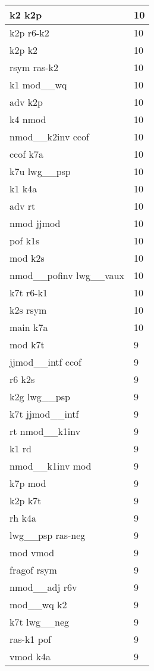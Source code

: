\documentclass[a4 paper]{article}
\begin{document}
\begin{longtable}{p{}p{}}
k2 k2p  & 10 \\ \midrule
k2p r6-k2  & 10 \\ \midrule
k2p k2  & 10 \\ \midrule
rsym ras-k2  & 10 \\ \midrule
k1 mod\_\_wq  & 10 \\ \midrule
adv k2p  & 10 \\ \midrule
k4 nmod  & 10 \\ \midrule
nmod\_\_k2inv ccof  & 10 \\ \midrule
ccof k7a  & 10 \\ \midrule
k7u lwg\_\_psp  & 10 \\ \midrule
k1 k4a  & 10 \\ \midrule
adv rt  & 10 \\ \midrule
nmod jjmod  & 10 \\ \midrule
pof k1s  & 10 \\ \midrule
mod k2s  & 10 \\ \midrule
nmod\_\_pofinv lwg\_\_vaux  & 10 \\ \midrule
k7t r6-k1  & 10 \\ \midrule
k2s rsym  & 10 \\ \midrule
main k7a  & 10 \\ \midrule
mod k7t  & 9 \\ \midrule
jjmod\_\_intf ccof  & 9 \\ \midrule
r6 k2s  & 9 \\ \midrule
k2g lwg\_\_psp  & 9 \\ \midrule
k7t jjmod\_\_intf  & 9 \\ \midrule
rt nmod\_\_k1inv  & 9 \\ \midrule
k1 rd  & 9 \\ \midrule
nmod\_\_k1inv mod  & 9 \\ \midrule
k7p mod  & 9 \\ \midrule
k2p k7t  & 9 \\ \midrule
rh k4a  & 9 \\ \midrule
lwg\_\_psp ras-neg  & 9 \\ \midrule
mod vmod  & 9 \\ \midrule
fragof rsym  & 9 \\ \midrule
nmod\_\_adj r6v  & 9 \\ \midrule
mod\_\_wq k2  & 9 \\ \midrule
k7t lwg\_\_neg  & 9 \\ \midrule
ras-k1 pof  & 9 \\ \midrule
vmod k4a  & 9 \\ \midrule

\end{longtable}
\end{document}

